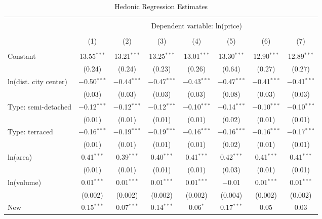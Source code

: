 
\begin{table}[!htbp] \centering 
  \caption{Hedonic Regression Estimates} 
  \label{tab:hedreg_year_loc_int} 
\footnotesize 
\begin{tabular}{@{\extracolsep{5pt}}lccccccc} 
\\[-1.8ex]\hline 
\hline \\[-1.8ex] 
 & \multicolumn{7}{c}{Dependent variable: ln(price)} \\ 
\cline{2-8} 
\\[-1.8ex] & (1) & (2) & (3) & (4) & (5) & (6) & (7)\\ 
\hline \\[-1.8ex] 
 Constant & 13.55$^{***}$ & 13.21$^{***}$ & 13.25$^{***}$ & 13.01$^{***}$ & 13.30$^{***}$ & 12.90$^{***}$ & 12.89$^{***}$ \\ 
  & (0.24) & (0.24) & (0.23) & (0.26) & (0.64) & (0.27) & (0.27) \\ 
  ln(dist. city center) & $-$0.50$^{***}$ & $-$0.44$^{***}$ & $-$0.47$^{***}$ & $-$0.43$^{***}$ & $-$0.47$^{***}$ & $-$0.41$^{***}$ & $-$0.41$^{***}$ \\ 
  & (0.03) & (0.03) & (0.03) & (0.03) & (0.08) & (0.03) & (0.03) \\ 
  Type: semi-detached & $-$0.12$^{***}$ & $-$0.12$^{***}$ & $-$0.12$^{***}$ & $-$0.10$^{***}$ & $-$0.14$^{***}$ & $-$0.10$^{***}$ & $-$0.10$^{***}$ \\ 
  & (0.01) & (0.01) & (0.01) & (0.01) & (0.02) & (0.01) & (0.01) \\ 
  Type: terraced & $-$0.16$^{***}$ & $-$0.19$^{***}$ & $-$0.19$^{***}$ & $-$0.16$^{***}$ & $-$0.16$^{***}$ & $-$0.16$^{***}$ & $-$0.17$^{***}$ \\ 
  & (0.01) & (0.01) & (0.01) & (0.01) & (0.02) & (0.01) & (0.01) \\ 
  ln(area) & 0.41$^{***}$ & 0.39$^{***}$ & 0.40$^{***}$ & 0.41$^{***}$ & 0.42$^{***}$ & 0.41$^{***}$ & 0.41$^{***}$ \\ 
  & (0.01) & (0.01) & (0.01) & (0.01) & (0.03) & (0.01) & (0.01) \\ 
  ln(volume) & 0.01$^{***}$ & 0.01$^{***}$ & 0.01$^{***}$ & 0.01$^{***}$ & $-$0.01 & 0.01$^{***}$ & 0.01$^{***}$ \\ 
  & (0.002) & (0.002) & (0.002) & (0.002) & (0.004) & (0.002) & (0.002) \\ 
  New & 0.15$^{***}$ & 0.07$^{***}$ & 0.14$^{***}$ & 0.06$^{*}$ & 0.17$^{***}$ & 0.05 & 0.03 \\ 

\end{tabular}
\end{table}
